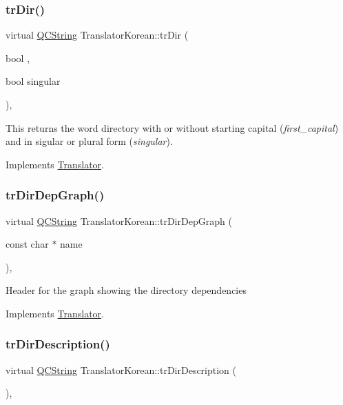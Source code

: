 \subsubsection{\texorpdfstring{trDir()}{trDir()}}
{\footnotesize\ttfamily virtual \mbox{\hyperlink{class_q_c_string}{Q\+C\+String}} Translator\+Korean\+::tr\+Dir (\begin{DoxyParamCaption}\item[{bool}]{,  }\item[{bool}]{singular }\end{DoxyParamCaption})\hspace{0.3cm}{\ttfamily [inline]}, {\ttfamily [virtual]}}

This returns the word directory with or without starting capital ({\itshape first\+\_\+capital}) and in sigular or plural form ({\itshape singular}). 

Implements \mbox{\hyperlink{class_translator}{Translator}}.

\mbox{\label{class_translator_korean_afb4e2f13f3ebe7949f1936127d730ed4}} 
\subsubsection{\texorpdfstring{trDirDepGraph()}{trDirDepGraph()}}
{\footnotesize\ttfamily virtual \mbox{\hyperlink{class_q_c_string}{Q\+C\+String}} Translator\+Korean\+::tr\+Dir\+Dep\+Graph (\begin{DoxyParamCaption}\item[{const char $\ast$}]{name }\end{DoxyParamCaption})\hspace{0.3cm}{\ttfamily [inline]}, {\ttfamily [virtual]}}

Header for the graph showing the directory dependencies 

Implements \mbox{\hyperlink{class_translator}{Translator}}.

\mbox{\label{class_translator_korean_a13c051ef5bb44c97e07ab91715858b92}} 
\subsubsection{\texorpdfstring{trDirDescription()}{trDirDescription()}}
{\footnotesize\ttfamily virtual \mbox{\hyperlink{class_q_c_string}{Q\+C\+String}} Translator\+Korean\+::tr\+Dir\+Description (\begin{DoxyParamCaption}{ }\end{DoxyParamCaption})\hspace{0.3cm}{\ttfamily [inline]}, {\ttfamily [virtual]}}

